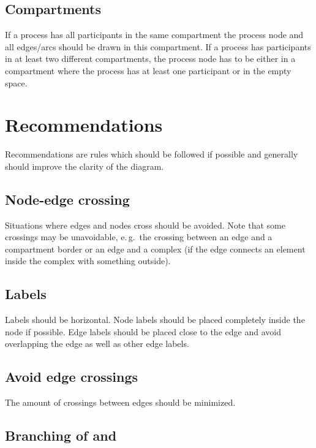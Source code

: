 \subsection{Compartments}

If a process has all participants in the same compartment the process node and all edges/arcs should be drawn in this compartment.  If a process has participants in at least two different compartments, the process node has to be either in a compartment where the process has at least one participant or in the empty space.

\section{Recommendations}

Recommendations are rules which should be followed if possible and generally should improve the clarity of the diagram.

\subsection{Node-edge crossing}
\label{sec:crosEdNo}

Situations where edges and nodes cross should be avoided. Note that some crossings may be unavoidable, e.\,g.~the crossing between an edge and a compartment border or an edge and a complex (if the edge connects an element inside the complex with something outside).

\subsection{Labels}

Labels should be horizontal. Node labels should be placed completely
inside the node if possible. Edge labels should be placed close to
the edge and avoid overlapping the edge as well as other edge
labels.

\subsection{Avoid edge crossings}

The amount of crossings between edges should be minimized.

\subsection{Branching of  and }

